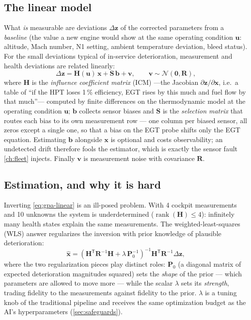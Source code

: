 \subsection{The linear model}

What \emph{is} measurable are deviations $\Delta\mathbf{z}$ of the corrected parameters from a
\emph{baseline} (the value a new engine would show at the same operating condition
$\mathbf{u}$: altitude, Mach number, N1 setting, ambient temperature deviation, bleed status).
For the small deviations typical of in-service deterioration, measurement and health deviations
are related linearly:
\begin{equation}
  \Delta\mathbf{z} = \mathbf{H}(\mathbf{u})\,\mathbf{x} + \mathbf{S}\,\mathbf{b} + \mathbf{v},
  \qquad \mathbf{v}\sim\mathcal{N}(\mathbf{0},\mathbf{R}),
  \label{eq:gpa-linear}
\end{equation}
where $\mathbf{H}$ is the \emph{influence coefficient matrix} (ICM) ---the Jacobian
$\partial\mathbf{z}/\partial\mathbf{x}$, i.e.\ a table of ``if the HPT loses 1\,\% efficiency,
EGT rises by this much and fuel flow by that much''--- computed by finite differences on the
thermodynamic model at the operating condition $\mathbf{u}$; $\mathbf{b}$ collects sensor
biases and $\mathbf{S}$ is the \emph{selection matrix} that routes each bias to its own
measurement row --- one column per biased sensor, all zeros except a single one, so that a
bias on the EGT probe shifts only the EGT equation. Estimating $\mathbf{b}$ alongside
$\mathbf{x}$ is optional and costs observability; an undetected drift therefore fools the
estimator, which is exactly the sensor fault \cref{ch:fleet} injects. Finally $\mathbf{v}$ is
measurement noise with covariance $\mathbf{R}$.

\subsection{Estimation, and why it is hard}

Inverting \cref{eq:gpa-linear} is an ill-posed problem. With 4 cockpit measurements and 10
unknowns the system is underdetermined ($\operatorname{rank}(\mathbf{H})\leq 4$): infinitely
many health states explain the same measurements. The weighted-least-squares (WLS) answer
regularizes the inversion with prior knowledge of plausible deterioration:
\begin{equation}
  \hat{\mathbf{x}} = \left(\mathbf{H}^{\mathsf T}\mathbf{R}^{-1}\mathbf{H}
  + \lambda\,\mathbf{P}_0^{-1}\right)^{-1}\mathbf{H}^{\mathsf T}\mathbf{R}^{-1}\Delta\mathbf{z},
  \label{eq:wls}
\end{equation}
where the two regularization pieces play distinct roles: $\mathbf{P}_0$ (a diagonal matrix of
expected deterioration magnitudes squared) sets the \emph{shape} of the prior --- which
parameters are allowed to move more --- while the scalar $\lambda$ sets its \emph{strength},
trading fidelity to the measurements against fidelity to the prior. $\lambda$ is a tuning knob
of the traditional pipeline and receives the same optimization budget as the AI's
hyperparameters (\cref{sec:safeguards}).

